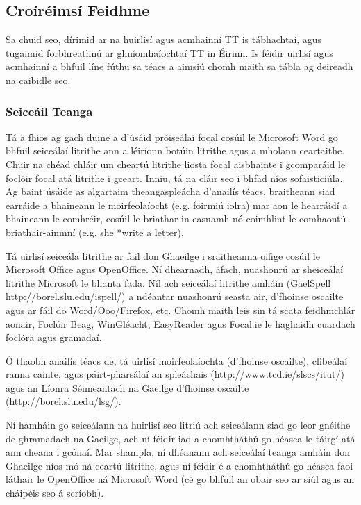 \begin{multicols}{2}
\subsection{Croíréimsí Feidhme} 

Sa chuid seo, dírimid ar na huirlisí agus acmhainní TT is tábhachtaí, agus tugaimid forbhreathnú ar ghníomhaíochtaí TT in Éirinn. Is féidir uirlisí agus acmhainní a bhfuil líne fúthu sa téacs a aimsiú chomh maith sa tábla ag deireadh na caibidle seo. 

\subsubsection{Seiceáil Teanga}

Tá a fhios ag gach duine a d’úsáid próiseálaí focal cosúil le Microsoft Word go bhfuil seiceálaí litrithe ann a léiríonn botúin litrithe agus a mholann ceartaithe. Chuir na chéad chláir um cheartú litrithe liosta focal aisbhainte i gcomparáid le foclóir focal atá litrithe i gceart. Inniu, tá na cláir seo i bhfad níos sofaisticiúla. Ag baint úsáide as algartaim theangaspleácha d’anailís téacs, braitheann siad earráide a bhaineann le moirfeolaíocht (e.g. foirmiú iolra) mar aon le hearráidí a bhaineann le comhréir, cosúil le briathar in easnamh nó coimhlint le comhaontú briathair-ainmní (e.g. she *write a letter). 

Tá uirlisí seiceála litrithe ar fail don Ghaeilge i sraitheanna oifige cosúil le Microsoft Office agus OpenOffice. Ní dhearnadh, áfach, nuashonrú ar sheiceálaí litrithe Microsoft le blianta fada. Níl ach seiceálaí litrithe amháin (GaelSpell http://borel.slu.edu/ispell/) a ndéantar nuashonrú seasta air, d’fhoinse oscailte agus ar fáil do Word/Ooo/Firefox, etc. Chomh maith leis sin tá scata feidhmchlár aonair, Foclóir Beag, WinGléacht, EasyReader agus Focal.ie le haghaidh cuardach foclóra agus gramadaí.

Ó thaobh anailís téacs de, tá uirlisí moirfeolaíochta (d’fhoinse oscailte), clibeálaí ranna cainte, agus páirt-pharsálaí an spleáchais (http://www.tcd.ie/slscs/itut/) agus  an Líonra Séimeantach na Gaeilge d’fhoinse oscailte (http://borel.slu.edu/lsg/).

Ní hamháin go seiceálann na huirlisí seo litriú ach seiceálann siad go leor gnéithe de ghramadach na Gaeilge, ach ní féidir iad a chomhtháthú go héasca le táirgí atá ann cheana i gcónaí. Mar shampla, ní dhéanann ach seiceálaí teanga amháin don Ghaeilge \cite{gramadoir} níos mó ná ceartú litrithe, agus ní féidir é a chomhtháthú go héasca faoi láthair le OpenOffice ná Microsoft Word (cé go bhfuil an obair seo ar siúl agus an cháipéis seo á scríobh).  



\end{multicols}
